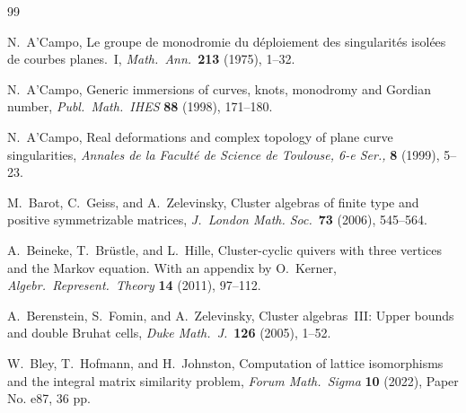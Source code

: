 \documentclass[11pt, letterpaper]{amsart}
\theoremstyle{definition}
\numberwithin{equation}{section}
\begin{document}



\newpage 

\begin{thebibliography}{99}


N.~A'Campo, 
Le groupe de monodromie du d\'eploiement des singularit\'es
isol\'ees de courbes planes.~I, \textsl{Math.\ Ann.}\ \textbf{213}
(1975), 1--32. 

N.~A'Campo, 
Generic immersions of curves, knots, monodromy and Gordian number, 
\textsl{Publ.\ Math.\ IHES} \textbf{88} (1998), 171--180.

N.~A'Campo,
Real deformations and complex topology of
  plane curve singularities, 
\textsl{Annales de la Facult\'e de Science de Toulouse, 6-e Ser.,}
       \textbf{8} (1999), 5--23.



M.~Barot, C.~Geiss, and A.~Zelevinsky, 
Cluster algebras of finite type and positive symmetrizable matrices,  
\textsl{J.~London Math. Soc.}\ \textbf{73} (2006), 545--564. 

A.~Beineke, T.~Br\"ustle, and L.~Hille, 
Cluster-cyclic quivers with three vertices and the Markov equation. 
With an appendix by O.~Kerner, 
\textsl{Algebr.\ Represent.\ Theory} \textbf{14} (2011), 97--112. 

A.~Berenstein, S.~Fomin, and A.~Zelevinsky, 
Cluster algebras~III: Upper bounds and double Bruhat cells,
\textsl{Duke Math.~J.}\ \textbf{126} (2005), 1--52. 

W.~Bley, T.~Hofmann, and H.~Johnston, 
Computation of lattice isomorphisms and the integral matrix similarity problem, 
\textsl{Forum Math.\ Sigma} \textbf{10} (2022), Paper No. e87, 36 pp.


\end{thebibliography}
\end{document}
